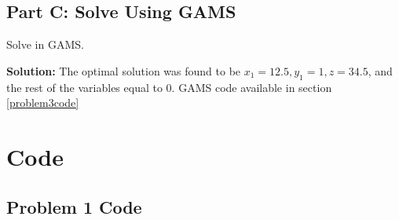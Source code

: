 \documentclass[11pt]{article}
\begin{document}
\subsection{Part C: Solve Using GAMS}
Solve in GAMS.

\textbf{Solution:}
The optimal solution was found to be $x_1=12.5, y_1=1, z=34.5$, and the rest of the variables equal to 0.
GAMS code available in section \ref{problem3code}


\clearpage
\section{Code}
\subsection{Problem 1 Code}
\label{problem1code}
\end{document}
